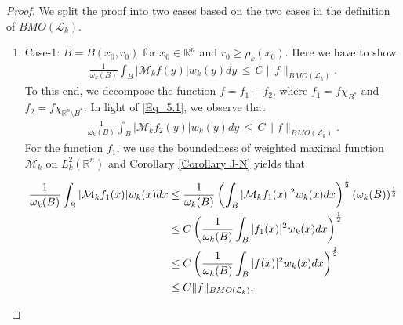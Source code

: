 \documentclass[11pt, reqno]{amsproc}
\theoremstyle{definition}
\theoremstyle{remark}
\numberwithin{equation}{section}
\begin{document}
\begin{proof} We split the proof into two cases based on the two cases in the definition of $BMO(\mathcal{L}_k)$.
 \begin{enumerate}[$i)$]

 \item Case-1: $B=B(x_0,r_0)$ for $x_0\in \mathbb{R}^n$ and $r_0\geq {\rho_k}(x_0)$. Here we have to show 
     \begin{align} \label{case-2}
         \frac{1}{\omega_k(B)}\int_B |\mathcal{M}_kf(y)|w_k(y)dy \,\leq \,C\|f\|_{BMO(\mathcal{L}_k)}.
     \end{align} To this end, we decompose the function $f=f_1+f_2$, where $f_1= f\chi_{B^*}$ and $f_2=f\chi_{\mathbb{R}^n\setminus B^*}$.  In light of  \eqref{Eq_5.1}, we observe that 
     \begin{align} \label{f_2}
         \frac{1}{\omega_k(B)}\int_B |\mathcal{M}_kf_2(y)|w_k(y)dy \,\leq \,C\|f\|_{BMO(\mathcal{L}_k)}.
     \end{align} 
     For the function $f_1$, we use the boundedness of weighted maximal function $\mathcal{M}_k$  on $L_k^2(\mathbb{R}^n)$ \cite{Alto-2011} and Corollary \ref{Corollary J-N} yields that 
     \begin{align}
         \frac{1}{\omega_k(B)}\int_B |\mathcal{M}_kf_1(x)|w_k(x)dx& \leq \frac{1}{\omega_k(B)}\left( \int_B |\mathcal{M}_kf_1(x)|^2w_k(x)dx \right)^{\frac{1}{2}} (\omega_k(B))^{\frac{1}{2}}\notag \\
         &  \leq C \left(\frac{1}{\omega_k(B)} \int_B |f_1(x)|^2w_k(x)dx \right)^{\frac{1}{2}} \notag \\
          &  \leq C \left(\frac{1}{\omega_k(B)} \int_B |f(x)|^2w_k(x)dx \right)^{\frac{1}{2}} \notag \\
          & \leq C \|f\|_{BMO(\mathcal{L}_k)}. \label{f_1}
     \end{align}




\end{enumerate}
\end{proof}
\end{document}
